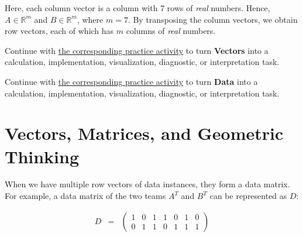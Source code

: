 \documentclass[
  letterpaper,
]{scrbook}
\begin{document}
Here, each column vector is a column with \(7\) rows of \emph{real}
numbers. Hence, \(A \in \mathbb{R}^m\) and \(B \in \mathbb{R}^m\), where
\(m=7\). By transposing the column vectors, we obtain row vectors, each
of which has \(m\) columns of \emph{real} numbers.

\begin{tcolorbox}[enhanced jigsaw, arc=.35mm, bottomrule=.15mm, bottomtitle=1mm, breakable, colback=white, colbacktitle=quarto-callout-tip-color!10!white, colframe=quarto-callout-tip-color-frame, coltitle=black, left=2mm, leftrule=.75mm, opacityback=0, opacitybacktitle=0.6, rightrule=.15mm, title=\textcolor{quarto-callout-tip-color}{\faLightbulb}\hspace{0.5em}{Put it into practice}, titlerule=0mm, toprule=.15mm, toptitle=1mm]

Continue with \hyperref[sec-pr-02-vectors]{the corresponding practice
activity} to turn \textbf{Vectors} into a calculation, implementation,
visualization, diagnostic, or interpretation task.

\end{tcolorbox}

\begin{tcolorbox}[enhanced jigsaw, arc=.35mm, bottomrule=.15mm, bottomtitle=1mm, breakable, colback=white, colbacktitle=quarto-callout-tip-color!10!white, colframe=quarto-callout-tip-color-frame, coltitle=black, left=2mm, leftrule=.75mm, opacityback=0, opacitybacktitle=0.6, rightrule=.15mm, title=\textcolor{quarto-callout-tip-color}{\faLightbulb}\hspace{0.5em}{Put it into practice}, titlerule=0mm, toprule=.15mm, toptitle=1mm]

Continue with \hyperref[sec-pr-02-data]{the corresponding practice
activity} to turn \textbf{Data} into a calculation, implementation,
visualization, diagnostic, or interpretation task.

\end{tcolorbox}

\chapter{Vectors, Matrices, and Geometric Thinking}\label{ch-matrix}

When we have multiple row vectors of data instances, they form a data
matrix. For example, a data matrix of the two teams \(A^T\) and \(B^T\)
can be represented as \(D\):

\[\begin{aligned}
    D   & = &
    \begin{pmatrix}
        1 & 0 & 1 & 1 & 0 & 1 & 0 \\
        0 & 1 & 1 & 0 & 1 & 1 & 1
    \end{pmatrix}
\end{aligned}\]
\end{document}
